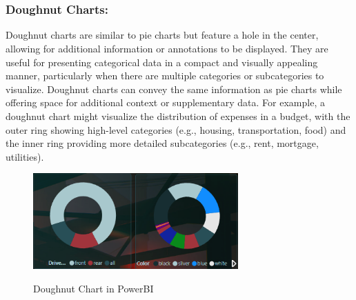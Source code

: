 \documentclass{article}
\begin{document}
{\\
\\
\newpage
\subsubsection{Doughnut Charts:}
Doughnut charts are similar to pie charts but feature a hole in the center, allowing for additional information or annotations to be displayed. They are useful for presenting categorical data in a compact and visually appealing manner, particularly when there are multiple categories or subcategories to visualize. Doughnut charts can convey the same information as pie charts while offering space for additional context or supplementary data. For example, a doughnut chart might visualize the distribution of expenses in a budget, with the outer ring showing high-level categories (e.g., housing, transportation, food) and the inner ring providing more detailed subcategories (e.g., rent, mortgage, utilities).
\\
\begin{figure}[htbp]
  \centering
  \vspace{0.3cm}
  \includegraphics[width=0.7\textwidth]{Figures/PowerBI/doughnut.png}\\
  \caption{Doughnut Chart in PowerBI}
  \vspace{0.3cm}
\end{figure}
\\
}


\newpage
\end{document}
